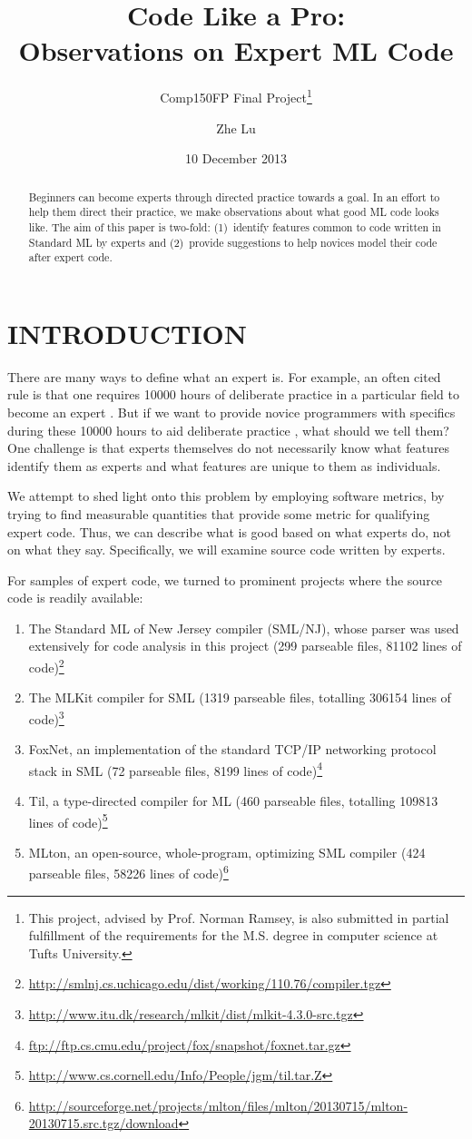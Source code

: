 \documentclass[12pt,abstracton]{scrartcl}
\title{Code Like a Pro:\\Observations on Expert ML Code}
\subtitle{Comp150FP Final Project\footnote{This project, advised by Prof. Norman Ramsey, is also submitted in partial fulfillment of the requirements for the M.S. degree in computer science at Tufts University.}}
\author{Zhe Lu}
\date{10 December 2013}
\begin{document}


\maketitle
\begin{abstract}
Beginners can become experts through directed practice towards a goal. In an effort to
help them direct their practice, we make observations about what good ML code looks like.
The aim of this paper is two-fold: (1)~identify features common to code written in Standard ML by experts and
(2)~provide suggestions to help novices model their code after expert code.
\end{abstract}
\section{INTRODUCTION}
There are many ways to define what an expert is.
For example, an often cited rule is that one requires 10000 hours of deliberate practice
in a particular field to become an expert \cite{Gla08}. But if we want to provide novice programmers
with specifics during these 10000 hours to aid deliberate practice \cite{Eri93}, what should we tell them? One challenge is that experts themselves
do not necessarily know what features identify them as experts and what features are unique to them as individuals.

We attempt to shed light onto this problem by employing software metrics,
by trying to find measurable quantities
that provide some metric for qualifying expert code.
Thus, we can describe what is good based on what experts do, not on what they say.
Specifically, we will examine source code written by experts.

For samples of expert code, we turned to prominent projects where the source code is readily available:
\begin{enumerate}
\item The Standard ML of New Jersey compiler (SML/NJ), whose parser was used extensively for code analysis in this project (299 parseable files, 81102 lines of code)\footnote{\url{http://smlnj.cs.uchicago.edu/dist/working/110.76/compiler.tgz}}
\item The MLKit compiler for SML (1319 parseable files, totalling 306154 lines of code)\footnote{\url{http://www.itu.dk/research/mlkit/dist/mlkit-4.3.0-src.tgz}}
\item FoxNet, an implementation of the standard TCP/IP networking protocol stack in SML (72 parseable files, 8199 lines of code)\footnote{\url{ftp://ftp.cs.cmu.edu/project/fox/snapshot/foxnet.tar.gz}}
\item Til, a type-directed compiler for ML (460 parseable files, totalling 109813 lines of code)\footnote{\url{http://www.cs.cornell.edu/Info/People/jgm/til.tar.Z}}
\item MLton, an open-source, whole-program, optimizing SML compiler (424 parseable files, 58226 lines of code)\footnote{\url{http://sourceforge.net/projects/mlton/files/mlton/20130715/mlton-20130715.src.tgz/download}}
\end{enumerate}
\end{document}
